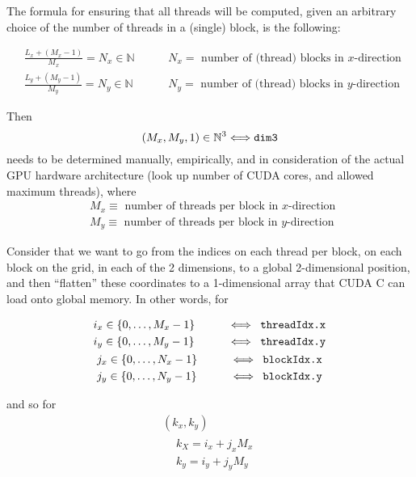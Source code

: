 \documentclass[10pt]{amsart}
\begin{document}
\begin{multicols*}{2}
The formula for ensuring that all threads will be computed, given an arbitrary choice of the number of threads in a (single) block, is the following:

\[
\begin{aligned}
  & \frac{L_x + ( M_x - 1) }{ M_x} = N_x \in \mathbb{N} \qquad \, & N_x = \text{ number of (thread) blocks in $x$-direction } \\ 
  & \frac{L_y + ( M_y - 1) }{ M_y} = N_y \in \mathbb{N} \qquad \, & N_y = \text{ number of (thread) blocks in $y$-direction } 
\end{aligned}
\]

Then
\[
(M_x, M_y, 1) \in \mathbb{N}^3  \Longleftrightarrow \verb|dim3|
\]
needs to be determined manually, empirically, and in consideration of the actual GPU hardware architecture (look up number of CUDA cores, and allowed maximum threads), where
\[
\begin{aligned}
  & M_x \equiv \text{ number of threads per block in $x$-direction } \\ 
  & M_y \equiv \text{ number of threads per block in $y$-direction } 
  \end{aligned}
\]

Consider that we want to go from the indices on each thread per block, on each block on the grid, in each of the 2 dimensions, to a global 2-dimensional position, and then ``flatten'' these coordinates to a 1-dimensional array that CUDA C can load onto global memory.  In other words, for

\[
\begin{gathered}
\begin{aligned}  
  & i_x \in \lbrace 0 , \dots , M_x - 1 \rbrace \qquad \, & \Longleftrightarrow \verb| threadIdx.x| \\ 
  & i_y \in \lbrace 0 , \dots , M_y - 1 \rbrace \qquad \, & \Longleftrightarrow \verb| threadIdx.y|
  \end{aligned} \\ 
\begin{aligned}
  & j_x \in \lbrace 0 , \dots , N_x - 1 \rbrace \qquad \, & \Longleftrightarrow \verb| blockIdx.x| \\ 
  & j_y \in \lbrace 0 , \dots , N_y - 1 \rbrace \qquad \, & \Longleftrightarrow \verb| blockIdx.y|
  \end{aligned}
\end{gathered}
\]

and so for
\[
\begin{gathered}
  (k_x,k_y) \\
\begin{aligned}
  & k_X = i_x + j_x M_x \\ 
  & k_y = i_y + j_y M_y
  \end{aligned} 
  \end{gathered}
\]


\end{multicols*}
\end{document}
